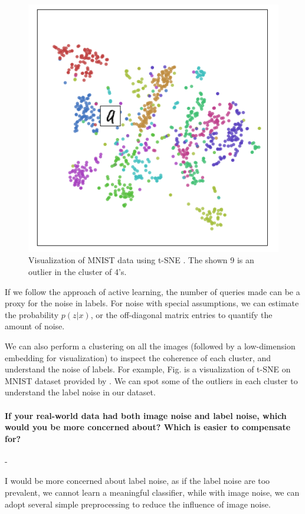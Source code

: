 \documentclass[11pt]{article}
\begin{document}
\begin{figure}[!ht]
    \centering
    \includegraphics[width=.8\textwidth]{Figs/tsne}
    \caption{Visualization of MNIST data using t-SNE \cite{1_olah_2017}. The shown 9 is an outlier in the cluster of 4's.}
\end{figure}


If we follow the approach of active learning, the number of queries made can be a proxy for the noise in labels. For noise with special assumptions, we can estimate the probability $p(z|x)$, or the off-diagonal matrix entries to quantify the amount of noise.

We can also perform a clustering on all the images (followed by a low-dimension embedding for visualization) to inspect the coherence of each cluster, and understand the noise of labels. For example, Fig. is a visualization of t-SNE \cite{maaten2008visualizing} on MNIST dataset provided by \cite{1_olah_2017}. We can spot some of the outliers in each cluster to understand the label noise in our dataset.


\paragraph{If your real-world data had both image noise and label noise, which would you be more concerned about? Which is easier to compensate for?} -

I would be more concerned about label noise, as if the label noise are too prevalent, we cannot learn a meaningful classifier, while with image noise, we can adopt several simple preprocessing to reduce the influence of image noise.



\end{document}
